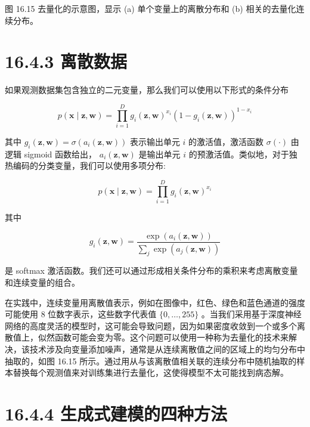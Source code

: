 \documentclass[10pt]{report}
\begin{document}
图 16.15 去量化的示意图，显示 (a) 单个变量上的离散分布和 (b) 相关的去量化连续分布。

\section*{16.4.3 离散数据}

如果观测数据集包含独立的二元变量，那么我们可以使用以下形式的条件分布

\[
p\left( {\mathbf{x} \mid  \mathbf{z},\mathbf{w}}\right)  = \mathop{\prod }\limits_{{i = 1}}^{D}{g}_{i}{\left( \mathbf{z},\mathbf{w}\right) }^{{x}_{i}}{\left( 1 - {g}_{i}\left( \mathbf{z},\mathbf{w}\right) \right) }^{1 - {x}_{i}} \tag{16.84}
\]

其中 \({g}_{i}\left( {\mathbf{z},\mathbf{w}}\right)  = \sigma \left( {{a}_{i}\left( {\mathbf{z},\mathbf{w}}\right) }\right)\) 表示输出单元 \(i\) 的激活值，激活函数 \(\sigma \left( \cdot \right)\) 由逻辑 sigmoid 函数给出， \({a}_{i}\left( {\mathbf{z},\mathbf{w}}\right)\) 是输出单元 \(i\) 的预激活值。类似地，对于独热编码的分类变量，我们可以使用多项分布:

\[
p\left( {\mathbf{x} \mid  \mathbf{z},\mathbf{w}}\right)  = \mathop{\prod }\limits_{{i = 1}}^{D}{g}_{i}{\left( \mathbf{z},\mathbf{w}\right) }^{{x}_{i}} \tag{16.85}
\]

其中

\[
{g}_{i}\left( {\mathbf{z},\mathbf{w}}\right)  = \frac{\exp \left( {{a}_{i}\left( {\mathbf{z},\mathbf{w}}\right) }\right) }{\mathop{\sum }\limits_{j}\exp \left( {{a}_{j}\left( {\mathbf{z},\mathbf{w}}\right) }\right) } \tag{16.86}
\]

是 softmax 激活函数。我们还可以通过形成相关条件分布的乘积来考虑离散变量和连续变量的组合。

在实践中，连续变量用离散值表示，例如在图像中，红色、绿色和蓝色通道的强度可能使用 8 位数字表示，这些数字代表值 \(\{ 0,\ldots ,{255}\}\) 。当我们采用基于深度神经网络的高度灵活的模型时，这可能会导致问题，因为如果密度收敛到一个或多个离散值上，似然函数可能会变为零。这个问题可以使用一种称为去量化的技术来解决，该技术涉及向变量添加噪声，通常是从连续离散值之间的区域上的均匀分布中抽取的，如图 16.15 所示。通过用从与该离散值相关联的连续分布中随机抽取的样本替换每个观测值来对训练集进行去量化，这使得模型不太可能找到病态解。

\section*{16.4.4 生成式建模的四种方法}
\end{document}
